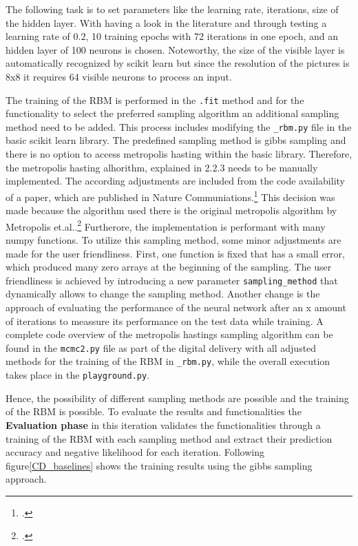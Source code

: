 The following task is to set parameters like the learning rate, iterations, size of the hidden layer. 
With having a look in the literature and through testing a learning rate of \(0.2\), 10 training epochs with 72 iterations in one epoch, and an hidden layer of 100 neurons is chosen.
Noteworthy, the size of the visible layer is automatically recognized by scikit learn but since the resolution of the pictures is 8x8 it requires 64 visible neurons to process an input.

The training of the \ac{RBM} is performed in the \texttt{.fit} method and for the functionality to select the preferred sampling algorithm an additional sampling method need to be added.
This process includes modifying the \texttt{\_rbm.py} file in the basic scikit learn library.
The predefined sampling method is gibbs sampling and there is no option to access metropolis hasting within the basic library. 
Therefore, the metropolis hasting alhorithm, explained in 2.2.3 needs to be manually implemented.
The according adjustments are included from the code availability of a paper, which are published in Nature Communiations.\footcite[cf.][11-12]{bohmNoiseinjectedAnalogIsing2022}
This decision was made because the algorithm used there is the original metropolis algorithm by Metropolis et.al..\footcite[cf.][1087-1092]{metropolisEquationStateCalculations1953}
Furtherore, the implementation is performant with many numpy functions. 
To utilize this sampling method, some minor adjustments are made for the user friendliness. 
First, one function is fixed that has a small error, which produced many zero arrays at the beginning of the sampling. 
The user friendliness is achieved by introducing a new parameter \texttt{sampling\_method} that dynamically allows to change the sampling method. 
Another change is the approach of evaluating the performance of the neural network after an x amount of iterations to meassure its performance on the test data while training.
A complete code overview of the metropolis hastings sampling algorithm can be found in the \texttt{mcmc2.py} file as part of the digital delivery with all
adjusted methods for the training of the \ac{RBM} in \texttt{\_rbm.py}, while the overall execution takes place in the \texttt{playground.py}.

Hence, the possibility of different sampling methods are possible and the training of the \ac{RBM} is possible.
To evaluate the results and functionalities the \textbf{Evaluation phase} in this iteration validates the functionalities through a training of the \ac{RBM} with each sampling method and extract their prediction accuracy 
and negative likelihood for each iteration. Following figure\ref{CD_baselines} shows the training results using the gibbs sampling approach. 

